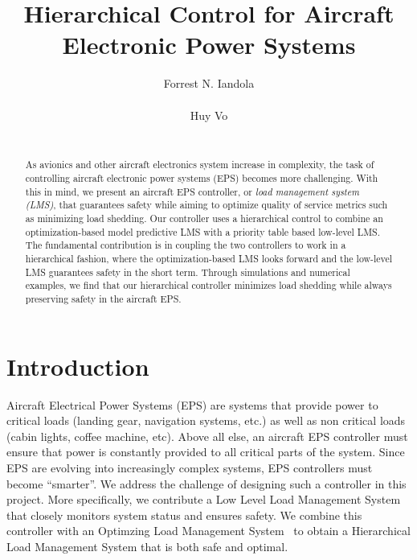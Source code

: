 \documentclass{acm_proc_article-sp}
\begin{document}
\title{Hierarchical Control for Aircraft Electronic Power Systems}

\author{
\alignauthor
Forrest N. Iandola\\
       \\
\alignauthor
Huy Vo\\
       \\
}

\maketitle
\begin{abstract}
As avionics and other aircraft electronics system increase in complexity, the task of controlling aircraft electronic power systems (EPS) becomes more challenging.
With this in mind, we present an aircraft EPS controller, or \emph{load management system (LMS)}, that guarantees safety while aiming to optimize quality of service metrics such as minimizing load shedding.
Our controller uses a hierarchical control to combine an optimization-based model predictive LMS with a priority table based low-level LMS.
The fundamental contribution is in coupling the two controllers to work in a hierarchical fashion, where the optimization-based LMS looks forward and the low-level LMS guarantees safety in the short term.
Through simulations and numerical examples, we find that our hierarchical controller minimizes load shedding while always preserving safety in the aircraft EPS.
\end{abstract}


\section{Introduction}
Aircraft Electrical Power Systems (EPS) are systems that provide power to critical loads (landing gear, navigation systems, etc.)
as well as non critical loads (cabin lights, coffee machine, etc). Above all else, an aircraft EPS controller must ensure that
power is constantly provided to all critical parts of the system. Since EPS are evolving into increasingly complex systems, EPS
controllers must become ``smarter''. We address the challenge of designing such a controller in this project. More specifically,
we contribute a Low Level Load Management System that closely monitors system status and ensures safety. We combine this
controller with an Optimzing Load Management System~\cite{mehdi} to obtain a Hierarchical Load Management System that is
both safe and optimal.
\end{document}
